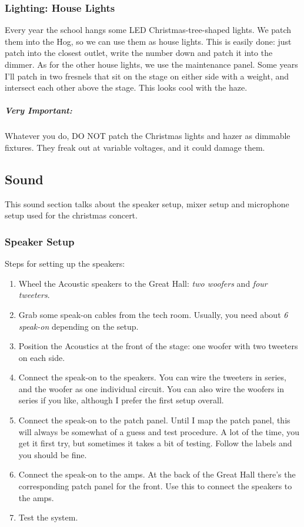 \documentclass[letterpaper,10pt,oneside,headsepline]{scrreprt}
\begin{document}
\subsubsection{Lighting: House Lights}
Every year the school hangs some LED Christmas-tree-shaped lights. We patch them into the Hog, so we can use them as house lights. This is easily done: just patch into the closest outlet, write the number down and patch it into the dimmer. As for the other house lights, we use the maintenance panel. Some years I'll patch in two fresnels that sit on the stage on either side with a weight, and intersect each other above the stage. This looks cool with the haze.

\subparagraph{Very Important:} Whatever you do, DO NOT patch the Christmas lights and hazer as dimmable fixtures. They freak out at variable voltages, and it could damage them.  

\subsection{Sound}
This sound section talks about the speaker setup, mixer setup and microphone setup used for the christmas concert.

\subsubsection{Speaker Setup}

Steps for setting up the speakers:
\begin{enumerate}
\item Wheel the Acoustic speakers to the Great Hall: \textit{two woofers} and \textit{four tweeters}.
\item Grab some speak-on cables from the tech room. Usually, you need about \textit{6 speak-on} depending on the setup.
\item Position the Acoustics at the front of the stage: one woofer with two tweeters on each side.
\item Connect the speak-on to the speakers. You can wire the tweeters in series, and the woofer as one individual circuit. You can also wire the woofers in series if you like, although I prefer the first setup overall.
\item Connect the speak-on to the patch panel. Until I map the patch panel, this will always be somewhat of a guess and test procedure. A lot of the time, you get it first try, but sometimes it takes a bit of testing. Follow the labels and you should be fine.
\item Connect the speak-on to the amps. At the back of the Great Hall there's the corresponding patch panel for the front. Use this to connect the speakers to the amps.
\item Test the system.
\end{enumerate} 
\end{document}
